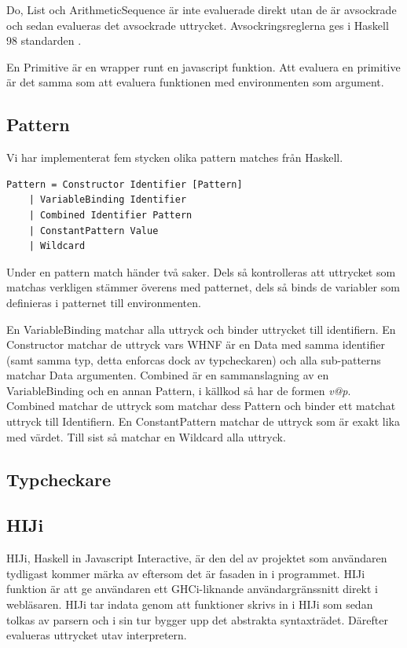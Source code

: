 Do, List och ArithmeticSequence är inte evaluerade direkt utan de är avsockrade och sedan evalueras det avsockrade uttrycket. Avsockringsreglerna ges i Haskell 98 standarden \citep{haskell98chap3}.

En Primitive är en wrapper runt en javascript funktion. Att evaluera en primitive är det samma som att evaluera funktionen med environmenten som argument.

\subsection{Pattern}
Vi har implementerat fem stycken olika pattern matches från Haskell.
\begin{lstlisting}
Pattern = Constructor Identifier [Pattern]
    | VariableBinding Identifier
    | Combined Identifier Pattern
    | ConstantPattern Value
    | Wildcard
\end{lstlisting}
Under en pattern match händer två saker. Dels så kontrolleras att uttrycket som matchas verkligen stämmer överens med patternet, dels så binds de variabler som definieras i patternet till environmenten. 

En VariableBinding matchar alla uttryck och binder uttrycket till identifiern. En Constructor matchar de uttryck vars WHNF är en Data med samma identifier (samt samma typ, detta enforcas dock av typcheckaren) och alla sub-patterns matchar Data argumenten. Combined är en sammanslagning av en VariableBinding och en annan Pattern, i källkod så har de formen \emph{v@p}. Combined matchar de uttryck som matchar dess Pattern och binder ett matchat uttryck till Identifiern. En ConstantPattern matchar de uttryck som är exakt lika med värdet. Till sist så matchar en Wildcard alla uttryck.


\subsection{Typcheckare} 

\subsection{HIJi}
HIJi, Haskell in Javascript Interactive, är den del av projektet som användaren tydligast kommer märka av eftersom det är fasaden in i programmet.
HIJi funktion är att ge användaren ett GHCi-liknande användargränssnitt direkt i webläsaren. 
HIJi tar indata genom att funktioner skrivs in i HIJi som sedan tolkas av parsern och i sin tur bygger upp det abstrakta syntaxträdet. Därefter evalueras uttrycket utav interpretern.

